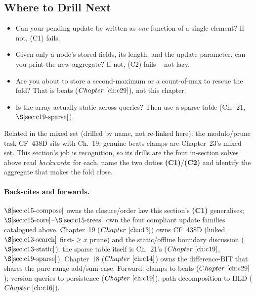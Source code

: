 \subsection{Where to Drill Next}

\begin{stuckbox}
\begin{itemize}[nosep,leftmargin=1.4em]
  \item Can your pending update be written as \emph{one} function of a single element?  If not, (C1) fails.
  \item Given only a node's stored fields, its length, and the update parameter, can you print the new aggregate?  If not, (C2) fails -- not lazy.
  \item Are you about to store a second-maximum or a count-of-max to rescue the fold?  That is beats (\(\chref{c29}\)), not this chapter.
  \item Is the array actually static across queries?  Then use a sparse table (Ch.~21, \(\secref{c19-sparse}\)).
\end{itemize}
\end{stuckbox}

Related in the mixed set (drilled by name, not re-linked here): the modulo/prune task CF~438D sits with Ch.~19; genuine beats clamps are Chapter~23's mixed set.  This section's job is recognition, so its drills are the four in-section solves above read \emph{backwards}: for each, name the two duties \textbf{(C1)}/\textbf{(C2)} and identify the aggregate that makes the fold close.

\paragraph{Back-cites and forwards.}
\(\secref{c15-compose}\) owns the closure/order law this section's \textbf{(C1)} generalises; \(\secref{c15-core}\)--\(\secref{c15-trees}\) own the four compliant update families catalogued above.  Chapter~19 (\(\chref{c13}\)) owns CF~438D (linked, \(\secref{c13-search}\) first-\(\ge x\) prune) and the static/offline boundary discussion (\(\secref{c13-static}\)); the sparse table itself is Ch.~21's (\(\chref{c19}\), \(\secref{c19-sparse}\)).  Chapter~18 (\(\chref{c14}\)) owns the difference-BIT that shares the pure range-add/sum case.  Forward: clamps to beats (\(\chref{c29}\)); version queries to persistence (\(\chref{c19}\)); path decomposition to HLD (\(\chref{c16}\)).

